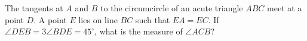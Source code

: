 The tangents at $A$ and $B$ to the circumcircle of an acute triangle $ABC$ meet at a point $D$. A point $E$ lies on line $BC$ such that $EA=EC$. If $\angle DEB=3\angle BDE=45^\circ$, what is the measure of $\angle ACB$?
